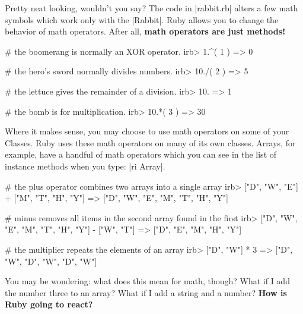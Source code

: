 \documentclass[12pt,twoside]{report}
\begin{document}
Pretty neat looking, wouldn't you say?  The code in
\rubyinline|rabbit.rb| alters a few math symbols which
work only with the \rubyinline|Rabbit|.  Ruby allows
you to change the behavior of math operators.  After all, {\bf math
  operators are just methods!}


\begin{consolecode}

 # the boomerang is normally an XOR operator.
 irb> 1.^( 1 )
   => 0

 # the hero's sword normally divides numbers.
 irb> 10./( 2 )
   => 5

 # the lettuce gives the remainder of a division.
 irb> 10.%
   => 1

 # the bomb is for multiplication.
 irb> 10.*( 3 )
   => 30

\end{consolecode}


Where it makes sense, you may choose to use math operators on some of
your Classes.  Ruby uses these math operators on many of its own
classes.  Arrays, for example, have a handful of math operators which
you can see in the list of instance methods when you type:
\rubyinline|ri Array|.


\begin{consolecode}

 # the plus operator combines two arrays into a single array
 irb> ["D", "W", "E"] + ["M", "T", "H", "Y"]
   => ["D", "W", "E", "M", "T", "H", "Y"]

 # minus removes all items in the second array found in the first
 irb> ["D", "W", "E", "M", "T", "H", "Y"] - ["W", "T"]
   => ["D", "E", "M", "H", "Y"]

 # the multiplier repeats the elements of an array
 irb> ["D", "W"] * 3
   => ["D", "W", "D", "W", "D", "W"]

\end{consolecode}


You may be wondering: what does this mean for math, though?  What if I
add the number three to an array?  What if I add a string and a
number?  {\bf How is Ruby going to react?}
\end{document}
